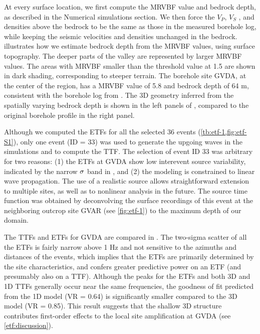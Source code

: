 At every surface location, we first compute the MRVBF value and bedrock depth, as described in the Numerical simulations section. We then force the $V_P$, $V_S$ , and densities above the bedrock to be the same as those in the measured borehole log, while keeping the seismic velocities and densities unchanged in the bedrock.  illustrates how we estimate bedrock depth from the MRVBF values, using surface topography. The deeper parts of the valley are represented by larger MRVBF values. The areas with MRVBF smaller than the threshold value at 1.5 are shown in dark shading, corresponding to steeper terrain. The borehole site GVDA, at the center of the region, has a MRVBF value of 5.8 and bedrock depth of 64 m, consistent with the borehole log from \citet{gibbsNearsurfaceSwaveVelocities1989}. The 3D geometry inferred from the spatially varying bedrock depth is shown in the left panels of , compared to the original borehole profile in the right panel.

Although we computed the ETFs for all the selected 36 events (\cref{tb:etf-1,fig:etf-S1}), only one event (ID = 33) was used to generate the upgoing waves in the simulations and to compute the TTF. The selection of event ID 33 was arbitrary for two reasons: (1) the ETFs at GVDA show low interevent source variability, indicated by the narrow $\rm \sigma$ band in , and (2) the modeling is constrained to linear wave propagation. The use of a realistic source allows straightforward extension to multiple sites, as well as to nonlinear analysis in the future. The source time function was obtained by deconvolving the surface recordings of this event at the neighboring outcrop site GVAR (see \cref{fig:etf-1}) to the maximum depth of our domain.

The TTFs and ETFs for GVDA are compared in . The two-sigma scatter of all the ETFs is fairly narrow above 1 Hz and not sensitive to the azimuths and distances of the events, which implies that the ETFs are primarily determined by the site characteristics, and confers greater predictive power on an ETF (and presumably also on a TTF). Although the peaks for the ETFs and both 3D and 1D TTFs generally occur near the same frequencies, the goodness of fit predicted from the 1D model (VR = 0.64) is significantly smaller compared to the 3D model (VR = 0.85). This result suggests that the shallow 3D structure contributes first-order effects to the local site amplification at GVDA (see \cref{etf:discussion}).

